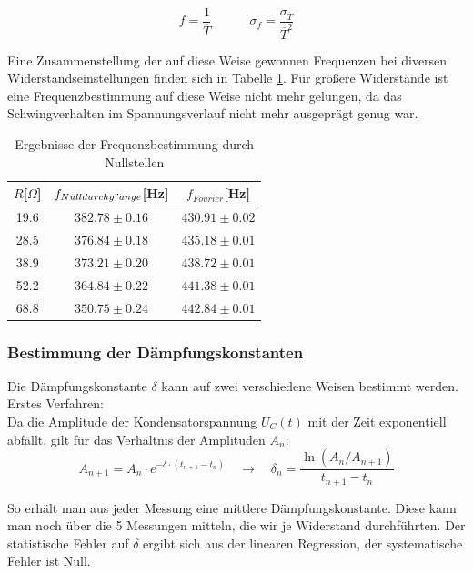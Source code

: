 \documentclass[12pt,a4paper]{article}
\begin{document}
\begin{equation}
f=\frac{1}{\overline{T}} \quad \quad \quad
\sigma_f=\frac{\sigma_{\overline{T}}}{\overline{T}^2}
\end{equation}

Eine Zusammenstellung der auf diese Weise gewonnen Frequenzen bei diversen Widerstandseinstellungen finden sich in Tabelle \ref{tab:Frequenzen}. Für größere Widerstände ist eine Frequenzbestimmung auf diese Weise nicht mehr gelungen, da das Schwingverhalten im Spannungsverlauf nicht mehr ausgeprägt genug war.

\begin{table}
\begin{center}
\begin{tabular}{|c|c|c|}
\hline
$R$[$\Omega$] & $f_{Nulldurchg"ange}$[Hz] & $f_{Fourier}$[Hz] \\
\hline
 19.6 & $382.78 \pm 0.16$ & $430.91 \pm 0.02$\\
\hline
 28.5 & $376.84 \pm 0.18$ & $435.18 \pm 0.01$\\
\hline
 38.9 & $373.21 \pm 0.20$ & $438.72 \pm 0.01$\\
\hline
 52.2 & $364.84 \pm 0.22$ & $441.38 \pm 0.01$\\
\hline
 68.8 & $350.75 \pm 0.24$ & $442.84 \pm 0.01$\\
\hline
\end{tabular}
\end{center}
\caption{Ergebnisse der Frequenzbestimmung durch Nullstellen}
\label{tab:Frequenzen}
\end{table}



\subsubsection{Bestimmung der Dämpfungskonstanten}
Die Dämpfungskonstante $\delta$ kann auf zwei verschiedene Weisen bestimmt werden.\\

Erstes Verfahren:\\
Da die Amplitude der Kondensatorspannung $U_C(t)$ mit der Zeit exponentiell abfällt, gilt für das Verhältnis der Amplituden $A_n$:
\begin{equation}
A_{n+1} = A_n \cdot e^{-\delta \cdot (t_{n+1} - t_n)} \quad \rightarrow \quad \delta_n = \frac{\ln ( A_n / A_{n+1})}{t_{n+1}-t_n}
\end{equation}

So erhält man aus jeder Messung eine mittlere Dämpfungskonstante. Diese kann man noch über die 5 Messungen mitteln, die wir je Widerstand durchführten. Der statistische Fehler auf $\delta$ ergibt sich aus der linearen Regression, der systematische Fehler ist Null.\\
\end{document}
